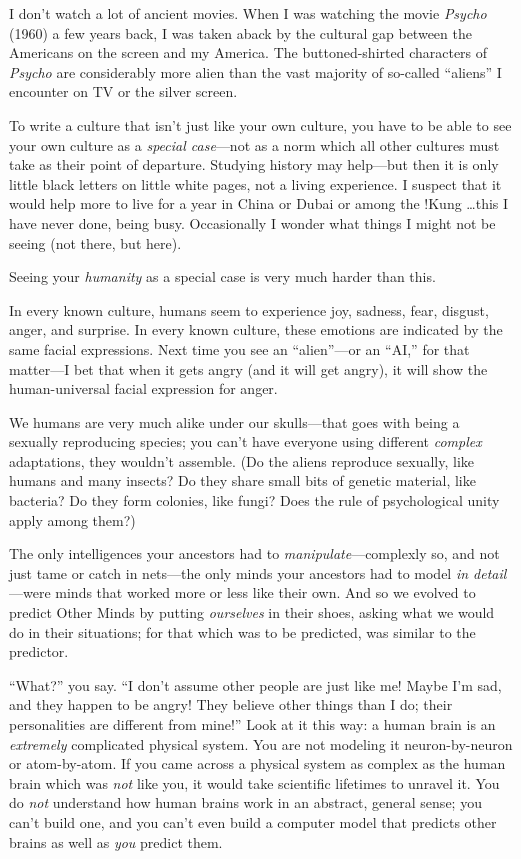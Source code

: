 {
 I don't watch a lot of ancient movies. When I was
watching the movie \textit{Psycho} (1960) a few years back, I was taken
aback by the cultural gap between the Americans on the screen and my
America. The buttoned-shirted characters of \textit{Psycho} are
considerably more alien than the vast majority of so-called
``aliens'' I encounter on TV or the
silver screen.}

{
 To write a culture that isn't just like your own
culture, you have to be able to see your own culture as a
\textit{special case}{}---not as a norm which all other cultures must
take as their point of departure. Studying history may help---but then
it is only little black letters on little white pages, not a living
experience. I suspect that it would help more to live for a year in
China or Dubai or among the !Kung \ldots this I have never done, being
busy. Occasionally I wonder what things I might not be seeing (not
there, but here).}

{
 Seeing your \textit{humanity} as a special case is very much
harder than this.}

{
 In every known culture, humans seem to experience joy, sadness,
fear, disgust, anger, and surprise. In every known culture, these
emotions are indicated by the same facial expressions. Next time you
see an ``alien''---or an
``AI,'' for that matter---I bet that
when it gets angry (and it will get angry), it will show the
human-universal facial expression for anger.}

{
 We humans are very much alike under our skulls---that goes with
being a sexually reproducing species; you can't have
everyone using different \textit{complex} adaptations, they
wouldn't assemble. (Do the aliens reproduce sexually,
like humans and many insects? Do they share small bits of genetic
material, like bacteria? Do they form colonies, like fungi? Does the
rule of psychological unity apply among them?)}

{
 The only intelligences your ancestors had to
\textit{manipulate}{}---complexly so, and not just tame or catch in
nets---the only minds your ancestors had to model \textit{in
detail}{}---were minds that worked more or less like their own. And so
we evolved to predict Other Minds by putting \textit{ourselves} in
their shoes, asking what we would do in their situations; for that
which was to be predicted, was similar to the predictor.}

{
 ``What?'' you say.
``I don't assume other people are just
like me! Maybe I'm sad, and they happen to be angry!
They believe other things than I do; their personalities are different
from mine!'' Look at it this way: a human brain is an
\textit{extremely} complicated physical system. You are not modeling it
neuron-by-neuron or atom-by-atom. If you came across a physical system
as complex as the human brain which was \textit{not} like you, it would
take scientific lifetimes to unravel it. You do \textit{not} understand
how human brains work in an abstract, general sense; you
can't build one, and you can't even
build a computer model that predicts other brains as well as
\textit{you} predict them.}

